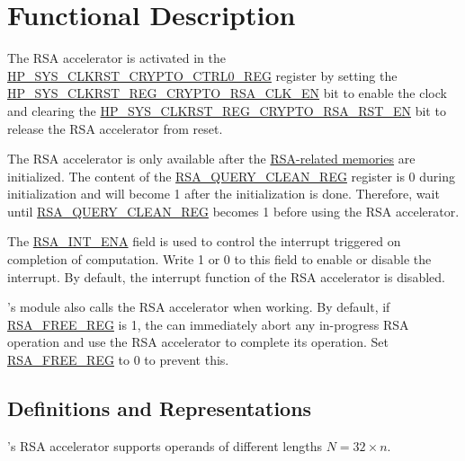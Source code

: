 \documentclass[main\_\_EN.tex]{subfiles}
\begin{document}
\section{Functional Description}\label{sec:rsa-func-desc}

The RSA accelerator is activated in the \hyperref[regdesc:HPSYSCLKRSTCRYPTOCTRL0REG]{HP\_SYS\_CLKRST\_CRYPTO\_CTRL0\_REG} register by setting the \hyperref[fielddesc:HPSYSCLKRSTREGCRYPTORSACLKEN]{HP\_SYS\_CLKRST\_REG\_CRYPTO\_RSA\_CLK\_EN} bit to enable the clock and clearing the \hyperref[fielddesc:HPSYSCLKRSTREGCRYPTORSARSTEN]{HP\_SYS\_CLKRST\_REG\_CRYPTO\_RSA\_RST\_EN} bit to release the RSA accelerator from reset.

The RSA accelerator is only available after the \hyperref[sec:mem-sum]{RSA-related memories} are initialized. The content of the \hyperref[regdesc:RSAQUERYCLEANREG]{RSA\_QUERY\_CLEAN\_REG} register is 0 during initialization and will become 1 after the initialization is done. Therefore, wait until \hyperref[regdesc:RSAQUERYCLEANREG]{RSA\_QUERY\_CLEAN\_REG} becomes 1 before using the RSA accelerator.

The \hyperref[fielddesc:RSAINTENA]{RSA\_INT\_ENA} field is used to control the interrupt triggered on completion of computation. Write 1 or 0 to this field to enable or disable the interrupt. By default, the interrupt function of the RSA accelerator is disabled.

\begin{importantlisting}
\vspace{-0.5em}

    \chipname{}'s  module also calls the RSA accelerator when working.
    By default, if \hyperref[regdesc:RSAFREEREG]{RSA\_FREE\_REG} is 1, the  can immediately abort any in-progress RSA operation and use the RSA accelerator to complete its operation. Set \hyperref[regdesc:RSAFREEREG]{RSA\_FREE\_REG} to 0 to prevent this.
\end{importantlisting}

\subsection{Definitions and Representations} \label{sec:rsa-definitions-representations}

\chipname{}'s RSA accelerator supports operands of different lengths \begin{math}N = 32 \times n\end{math}.
\end{document}
